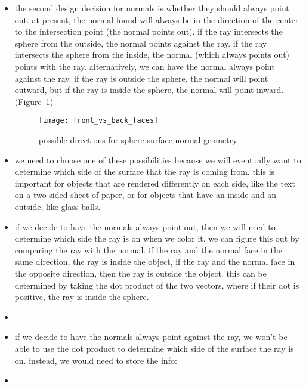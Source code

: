 \begin{itemize}
    \clearpage

    \item the second design decision for normals is whether they should always
        point out. at present, the normal found will always be in the direction
        of the center to the intersection point (the normal points out). if the
        ray intersects the sphere from the outside, the normal points against
        the ray. if the ray intersects the sphere from the inside, the normal
        (which always points out) points with the ray. alternatively, we can
        have the normal always point against the ray. if the ray is outside the
        sphere, the normal will point outward, but if the ray is inside the
        sphere, the normal will point inward.
        (Figure~\ref{fig:front_vs_back_faces})
        \begin{figure}[ht]
            \centering
            \texttt{[image: front\_vs\_back\_faces]}
            \captionsetup{labelfont=bf, textfont=it}
            \caption{possible directions for sphere surface-normal geometry}
            \label{fig:front_vs_back_faces}
        \end{figure}
    \item we need to choose one of these possibilities because we will
        eventually want to determine which side of the surface that the ray is
        coming from. this is important for objects that are rendered differently
        on each side, like the text on a two-sided sheet of paper, or for
        objects that have an inside and an outside, like glass balls.
    \item if we decide to have the normals always point out, then we will need
        to determine which side the ray is on when we color it. we can figure
        this out by comparing the ray with the normal. if the ray and the normal
        face in the same direction, the ray is inside the object, if the ray and
        the normal face in the opposite direction, then the ray is outside the
        object. this can be determined by taking the dot product of the two
        vectors, where if their dot is positive, the ray is inside the sphere.
    \item %
    \item if we decide to have the normals always point against the ray, we
        won't be able to use the dot product to determine which side of the
        surface the ray is on. instead, we would need to store the info:
    \item %

\end{itemize}
